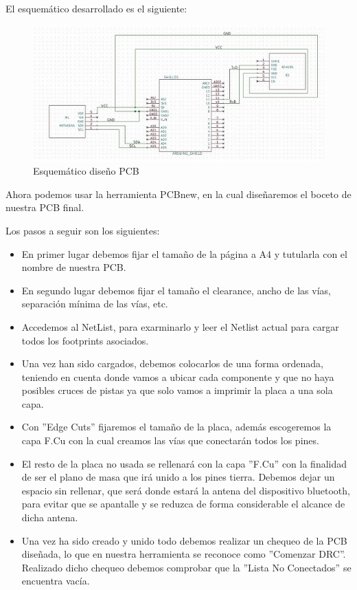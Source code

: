 		El esquemático desarrollado es el siguiente:
	
		\begin{figure}[h]
			\centering
			\includegraphics{imagenes/EsquematicoPCB.jpg}
			\caption{Esquemático dise\~no PCB}
			\label{contexto:figura}
		\end{figure}
		
		Ahora podemos usar la herramienta PCBnew, en la cual dise\~naremos el boceto de nuestra PCB final.
		
		Los pasos a seguir son los siguientes:
		
		\begin{itemize}	
			
			\item En primer lugar debemos fijar el tama\~no de la página a A4 y tutularla con el nombre de nuestra PCB.
			
			\item En segundo lugar debemos fijar el tamaño el clearance, ancho de las vías, separación mínima de las vías, etc.
			
			\item Accedemos al NetList, para exarminarlo y leer el Netlist actual para cargar todos los footprints asociados.
			
			\item Una vez han sido cargados, debemos colocarlos de una forma ordenada, teniendo en cuenta donde vamos a ubicar cada componente y que no haya posibles cruces de pistas ya que solo vamos a imprimir la placa a una sola capa.
			
			\item Con ''Edge Cuts'' fijaremos el tama\~no de la placa, además escogeremos la capa F.Cu con la cual creamos las vías que conectarán todos los pines.
			
			\item El resto de la placa no usada se rellenará con la capa ''F.Cu'' con la finalidad de  ser el plano de masa que irá unido a los pines tierra. Debemos dejar un espacio sin rellenar, que será donde estará la antena del dispositivo bluetooth, para evitar que se apantalle y se reduzca de forma considerable el alcance de dicha antena.
			
			\item Una vez ha sido creado y unido todo debemos realizar un chequeo de la PCB dise\~nada, lo que en nuestra herramienta se reconoce como ''Comenzar DRC''. Realizado dicho chequeo debemos comprobar que la ''Lista No Conectados'' se encuentra vacía.
			
		\end{itemize}
		
